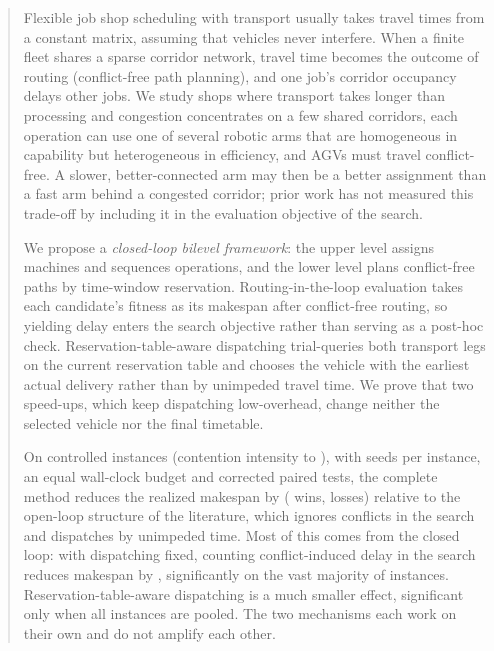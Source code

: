 \begin{abstract}
Flexible job shop scheduling with transport usually takes travel times from a constant matrix, assuming that vehicles never interfere.
When a finite fleet shares a sparse corridor network, travel time becomes the outcome of routing (conflict-free path planning), and one job's corridor occupancy delays other jobs.
We study shops where transport takes longer than processing and congestion concentrates on a few shared corridors, each operation can use one of several robotic arms that are homogeneous in capability but heterogeneous in efficiency, and AGVs must travel conflict-free.
A slower, better-connected arm may then be a better assignment than a fast arm behind a congested corridor; prior work has not measured this trade-off by including it in the evaluation objective of the search.

We propose a \emph{closed-loop bilevel framework}: the upper level assigns machines and sequences operations, and the lower level plans conflict-free paths by time-window reservation.
Routing-in-the-loop evaluation takes each candidate's fitness as its makespan after conflict-free routing, so yielding delay enters the search objective rather than serving as a post-hoc check.
Reservation-table-aware dispatching trial-queries both transport legs on the current reservation table and chooses the vehicle with the earliest actual delivery rather than by unimpeded travel time.
We prove that two speed-ups, which keep dispatching low-overhead, change neither the selected vehicle nor the final timetable.

On \NCases{} controlled instances (contention intensity \ContentionLo{} to \ContentionHi{}), with \NSeeds{} seeds per instance, an equal wall-clock budget and corrected paired tests, the complete method reduces the realized makespan by \GainEndToEnd{} (\WinEndToEnd{} wins, \LoseEndToEnd{} losses) relative to the open-loop structure of the literature, which ignores conflicts in the search and dispatches by unimpeded time.
Most of this comes from the closed loop: with dispatching fixed, counting conflict-induced delay in the search reduces makespan by \GainLoopRule{}, significantly on the vast majority of instances. Reservation-table-aware dispatching is a much smaller effect, significant only when all instances are pooled. The two mechanisms each work on their own and do not amplify each other.
\end{abstract}

%

